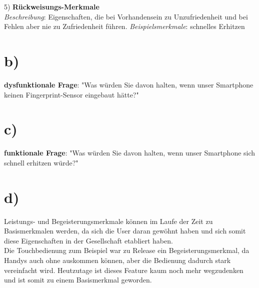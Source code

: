 \documentclass[12pt,pdftex,a4paper]{article}
\begin{document}
5) \textbf{Rückweisungs-Merkmale}\\
\textit{Beschreibung}: Eigenschaften, die bei Vorhandensein zu Unzufriedenheit und bei Fehlen aber nie zu Zufriedenheit führen.\newline
\textit{Beispielsmerkmale}: schnelles Erhitzen\\



\section*{b)}
\textbf{dysfunktionale Frage}: "Was würden Sie davon halten, wenn unser Smartphone keinen Fingerprint-Sensor eingebaut hätte?"
\section*{c)}
\textbf{funktionale Frage}: "Was würden Sie davon halten, wenn unser Smartphone sich schnell erhitzen würde?"
\section*{d)}
Leistungs- und Begeisterungsmerkmale können im Laufe der Zeit zu Basismerkmalen werden, da sich die User daran gewöhnt haben und sich somit diese Eigenschaften in der Gesellschaft etabliert haben.\\
Die Touchbedienung zum Beispiel war zu Release ein Begeisterungsmerkmal, da Handys auch ohne auskommen können, aber die Bedienung dadurch stark vereinfacht wird. Heutzutage ist dieses Feature kaum noch mehr wegzudenken und ist somit zu einem Basismerkmal geworden. 
\end{document}
